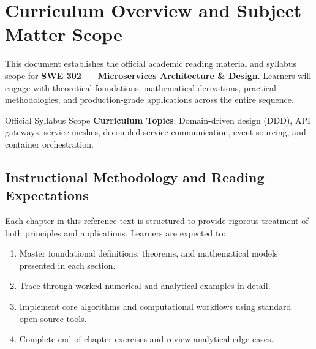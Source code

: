 \section{Curriculum Overview and Subject Matter Scope}

This document establishes the official academic reading material and syllabus scope for \textbf{SWE 302 --- Microservices Architecture \& Design}. Learners will engage with theoretical foundations, mathematical derivations, practical methodologies, and production-grade applications across the entire sequence.

\begin{InsightBox}{Official Syllabus Scope}
  \textbf{Curriculum Topics}: Domain-driven design (DDD), API gateways, service meshes, decoupled service communication, event sourcing, and container orchestration.
\end{InsightBox}

\subsection{Instructional Methodology and Reading Expectations}

Each chapter in this reference text is structured to provide rigorous treatment of both principles and applications. Learners are expected to:
\begin{enumerate}
  \item Master foundational definitions, theorems, and mathematical models presented in each section.
  \item Trace through worked numerical and analytical examples in detail.
  \item Implement core algorithms and computational workflows using standard open-source tools.
  \item Complete end-of-chapter exercises and review analytical edge cases.
\end{enumerate}

